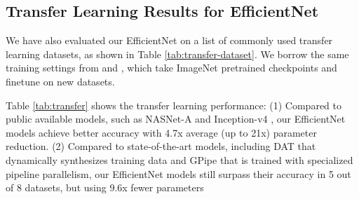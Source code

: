 \documentclass{article}
\begin{document}
\subsection{Transfer Learning Results for EfficientNet}
\begin{table}                                                
  \caption{                                                                         
      \textbf{Transfer Learning Datasets}.  
  }                                                                                 
  \vskip 0.1in
  \centering   
  \label{tab:transfer-dataset}
  \vskip -0.15in
\end{table} 
 
We have also evaluated our EfficientNet on a list of commonly used transfer learning datasets, as shown in Table \ref{tab:transfer-dataset}. We borrow the same training settings from \cite{imagenettransfer18} and \cite{gpipe18}, which take ImageNet pretrained checkpoints and finetune on new datasets.


Table \ref{tab:transfer} shows the transfer learning performance: (1) Compared to public available models, such as NASNet-A \cite{nas_imagenet18} and Inception-v4 \cite{inceptionv417}, our EfficientNet models achieve better accuracy with 4.7x average (up to 21x) parameter reduction.  (2) Compared to state-of-the-art models, including DAT \cite{domainjft18} that dynamically synthesizes training data and GPipe \cite{gpipe18} that is trained with specialized pipeline parallelism, our EfficientNet models still surpass their accuracy in 5 out of 8 datasets, but using 9.6x fewer parameters
\end{document}
